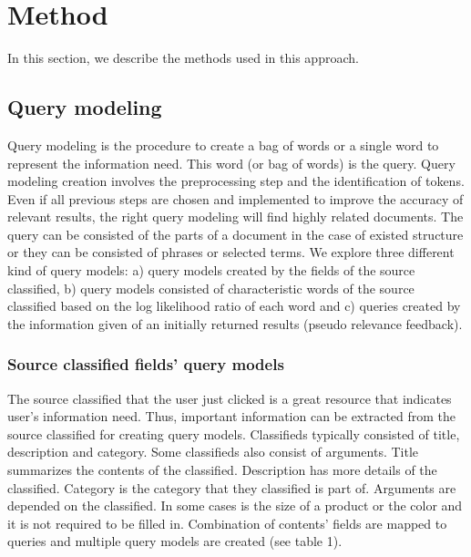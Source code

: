 \chapter{Method}

In this section, we describe the methods used in this approach.

\section{Query modeling}

Query modeling is the procedure to create a bag of words or a single word to represent the information need. This word (or bag of words) is the query. Query modeling creation involves the preprocessing step and the identification of tokens. Even if all previous steps are chosen and implemented to improve the accuracy of relevant results, the right query modeling will find highly related documents. The query can be consisted of the parts of a document in the case of existed structure or they can be consisted of phrases or selected terms. We explore three different kind of query models: a) query models created by the fields of the source classified, b) query models consisted of characteristic words of the source classified based on the log likelihood ratio of each word and c) queries created by the information given of an initially returned results (pseudo relevance feedback).

\subsection{Source classified fields' query models}

The source classified that the user just clicked is a great resource that indicates user's information need. Thus, important information can be extracted from the source classified for creating query models. Classifieds typically consisted of title, description and category. Some classifieds also consist of arguments. Title summarizes the contents of the classified. Description has more details of the classified. Category is the category that they classified is part of. Arguments are depended on the classified. In some cases is the size of a product or the color and it is not required to be filled in. Combination of contents' fields are mapped to queries and multiple query models are created (see table 1).


